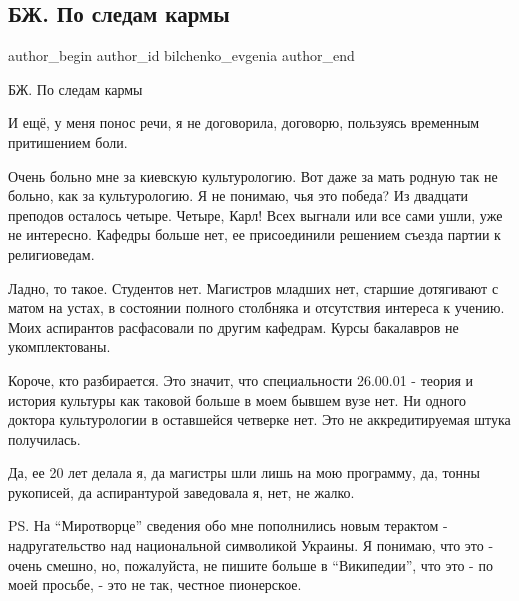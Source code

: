  
 
 
 
 
 
\subsection{БЖ. По следам кармы}
\label{sec:15_12_2021.fb.bilchenko_evgenia.1.po_sledam_karmy}
 
\ifcmt
 author_begin
   author_id bilchenko_evgenia
 author_end
\fi

БЖ. По следам кармы

И ещё, у меня понос речи, я не договорила, договорю, пользуясь временным
притишением боли.


Очень больно мне за киевскую культурологию. Вот даже за мать родную так не
больно, как за культурологию. Я не понимаю, чья это победа? Из двадцати
преподов осталось четыре. Четыре, Карл! Всех выгнали или все сами ушли, уже не
интересно. Кафедры больше нет, ее присоединили решением съезда партии к
религиоведам.

Ладно, то такое. Студентов нет. Магистров младших нет, старшие дотягивают с
матом на устах, в состоянии полного столбняка и отсутствия интереса к учению.
Моих аспирантов расфасовали  по другим кафедрам. Курсы бакалавров не
укомплектованы.

Короче, кто разбирается. Это значит, что специальности 26.00.01 - теория и
история культуры как таковой больше в моем бывшем вузе нет. Ни одного доктора
культурологии в оставшейся четверке нет. Это не аккредитируемая штука
получилась.

Да, ее 20 лет делала я, да магистры шли лишь на мою программу, да, тонны
рукописей, да аспирантурой заведовала я, нет, не жалко.

PS. На \enquote{Миротворце} сведения обо мне пополнились новым терактом -
надругательство над национальной символикой Украины. Я понимаю, что это - очень
смешно, но, пожалуйста, не пишите больше в \enquote{Википедии}, что это - по моей
просьбе, - это не так, честное пионерское.

